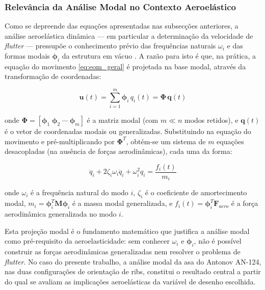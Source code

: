 \documentclass[a4paper,fleqn,noprintline]{cas-dc}
\begin{document}
\subsubsection{Relevância da Análise Modal no Contexto Aeroelástico}

Como se depreende das equações apresentadas nas subsecções anteriores, a análise aeroelástica dinâmica --- em particular a determinação da velocidade de \textit{flutter} --- pressupõe o conhecimento prévio das frequências naturais $\omega_i$ e das formas modais $\boldsymbol{\phi}_i$ da estrutura em vácuo \cite{Craig2006}. A razão para isto é que, na prática, a equação do movimento \eqref{eq:eom_geral} é projetada na base modal, através da transformação de coordenadas:

\begin{equation}
    \mathbf{u}(t) = \sum_{i=1}^{m} \boldsymbol{\phi}_i \, q_i(t) = 
    \boldsymbol{\Phi} \, \mathbf{q}(t)
    \label{eq:modal_transform}
\end{equation}

\noindent onde $\boldsymbol{\Phi} = [\boldsymbol{\phi}_1 \; 
\boldsymbol{\phi}_2 \; \cdots \; \boldsymbol{\phi}_m]$ é a matriz modal (com $m \ll n$ modos retidos), e $\mathbf{q}(t)$ é o vetor de coordenadas modais ou generalizadas. Substituindo na equação do movimento e pré-multiplicando por $\boldsymbol{\Phi}^T$, obtém-se um sistema de $m$ equações desacopladas (na ausência de forças aerodinâmicas), cada uma da forma:

\begin{equation}
    \ddot{q}_i + 2\zeta_i \omega_i \dot{q}_i + \omega_i^2 q_i = 
    \frac{f_i(t)}{m_i}
    \label{eq:modal_eq}
\end{equation}

\noindent onde $\omega_i$ é a frequência natural do modo $i$, $\zeta_i$ é o coeficiente de amortecimento modal, $m_i = \boldsymbol{\phi}_i^T \mathbf{M} \boldsymbol{\phi}_i$ é a massa modal generalizada, e $f_i(t) = \boldsymbol{\phi}_i^T \mathbf{F}_{aero}$ é a força aerodinâmica generalizada no modo $i$.

Esta projeção modal é o fundamento matemático que justifica a análise modal como pré-requisito da aeroelasticidade: sem conhecer $\omega_i$ e $\boldsymbol{\phi}_i$, não é possível construir as forças aerodinâmicas generalizadas nem resolver o problema de \textit{flutter}. No caso do presente trabalho, a análise modal da asa do Antonov AN-124, nas duas configurações de orientação de ribs, constitui o resultado central a partir do qual se avaliam as implicações aeroelásticas da variável de desenho escolhida.
\end{document}
